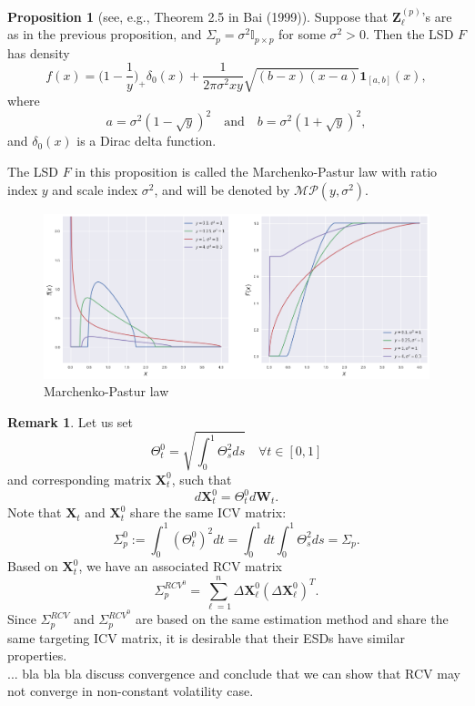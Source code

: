 \documentclass[a4paper,11pt]{article}
\theoremstyle{plain}
\theoremstyle{definition}
\newtheorem{rmrk}[thm]{Remark}
\newtheorem{prps}[thm]{Proposition}
\begin{document}
	\begin{prps}[see, e.g., Theorem 2.5 in Bai (1999)]
		Suppose that $\mathbf{Z}_\ell^{(p)}$'s are as in the previous proposition, and $\Sigma_p = \sigma^2 \mathbb{I}_{p \times p}$ for some $\sigma^2>0$. Then the LSD $F$ has density
		\[ f(x) = \Big(1-\frac{1}{y}\Big)_+\delta_0(x) + \frac{1}{2 \pi \sigma^2 xy} \sqrt{(b-x)(x-a)} \mathbf{1}_{[a,b]}(x), \]
		where 
		\[ a = \sigma^2(1-\sqrt{y})^2 \quad \text{and} \quad b = \sigma^2(1+\sqrt{y})^2, \]
		and $\delta_0(x)$ is a Dirac delta function.
	\end{prps}
	The LSD $F$ in this proposition is called the Marchenko-Pastur law with ratio index $y$ and scale index $\sigma^2$, and will be denoted by $\mathcal{MP}(y, \sigma^2)$.
	\begin{figure}
		\begin{center} \centering
			\includegraphics[scale=0.4]{MP}
			\caption{Marchenko-Pastur law}
		\end{center}
	\end{figure}
	
	\begin{rmrk}
		Let us set
		\[ \Theta_t^0 = \sqrt{\int_0^1\Theta_s^2 ds} \quad \forall t \in [0, 1] \]
		and corresponding matrix $\mathbf{X}_t^0$, such that
		\[ d\mathbf{X}_t^0 = \Theta_t^0d\mathbf{W}_t. \]
		Note that $\mathbf{X}_t$ and $\mathbf{X}_t^0$ share the same ICV matrix:
		\[ \Sigma_p^0 :=  \int_0^1(\Theta_t^0)^2 dt = \int_0^1 dt \int_0^1 \Theta_s^2 ds = \Sigma_p.  \]
		Based on $\mathbf{X}_t^0$, we have an associated RCV matrix
		\[ \Sigma_p^{RCV^0} = \sum_{\ell=1}^{n} \Delta \mathbf{X}_\ell^0 (\Delta \mathbf{X}_\ell^0)^T. \]
		Since $\Sigma_p^{RCV}$ and $\Sigma_p^{RCV^0}$ are based on the same estimation method and share the same targeting ICV matrix, it is desirable that their ESDs have similar properties. \\
		... bla bla bla discuss convergence and conclude that we can show that RCV may not converge in non-constant volatility case.
	\end{rmrk}
	
\end{document}
